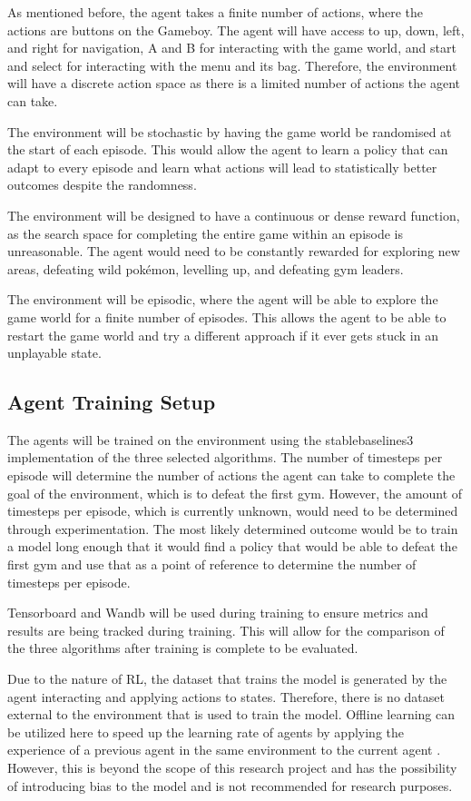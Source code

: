 As mentioned before, the agent takes a finite number of actions, where the actions are buttons on the Gameboy. The agent will have access to up, down, left, and right for navigation, A and B for interacting with the game world, and start and select for interacting with the menu and its bag. Therefore, the environment will have a discrete action space as there is a limited number of actions the agent can take. 

The environment will be stochastic by having the game world be randomised at the start of each episode. This would allow the agent to learn a policy that can adapt to every episode and learn what actions will lead to statistically better outcomes despite the randomness.

The environment will be designed to have a continuous or dense reward function, as the search space for completing the entire game within an episode is unreasonable. The agent would need to be constantly rewarded for exploring new areas, defeating wild pokémon, levelling up, and defeating gym leaders. 

The environment will be episodic, where the agent will be able to explore the game world for a finite number of episodes. This allows the agent to be able to restart the game world and try a different approach if it ever gets stuck in an unplayable state.

\subsection{Agent Training Setup}

The agents will be trained on the environment using the stablebaselines3 implementation of the three selected algorithms. The number of timesteps per episode will determine the number of actions the agent can take to complete the goal of the environment, which is to defeat the first gym. However, the amount of timesteps per episode, which is currently unknown, would need to be determined through experimentation. The most likely determined outcome would be to train a model long enough that it would find a policy that would be able to defeat the first gym and use that as a point of reference to determine the number of timesteps per episode. 

Tensorboard and Wandb will be used during training to ensure metrics and results are being tracked during training. This will allow for the comparison of the three algorithms after training is complete to be evaluated. 

Due to the nature of RL, the dataset that trains the model is generated by the agent interacting and applying actions to states. Therefore, there is no dataset external to the environment that is used to train the model. Offline learning can be utilized here to speed up the learning rate of agents by applying the experience of a previous agent in the same environment to the current agent \cite{Sutton1}. However, this is beyond the scope of this research project and has the possibility of introducing bias to the model and is not recommended for research purposes.

